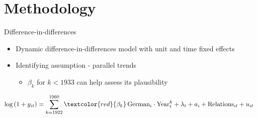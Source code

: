 \documentclass[11pt]{beamer}
\begin{document}
\section{Methodology}
\begin{frame}{Difference-in-differences}
\begin{itemize}
    \item Dynamic difference-in-differences model with unit and time fixed effects
    \item Identifying assumption - parallel trends 
    \begin{itemize}
        \item $\beta_k$ for $k < 1933$ can help assess its plausibility
    \end{itemize}
\end{itemize}

\begin{equation*}
 \log\left(1 + y_{it}\right) = \sum_{k= 1922}^{1960} \textcolor{red}{\beta_k}  \, \text{German}_{i} \cdot \text{Year}_{t}^k +  \lambda_t + a_i +  \text{Relations}_{it}   + u_{it}
 \label{eq:dynamic_did}
\end{equation*}
\end{frame}
\end{document}
